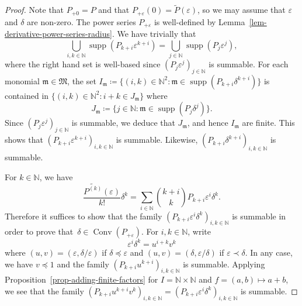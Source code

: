 \documentclass{article}
\newcommand{\assign}{\coloneqq}
\newcommand{\suchthat}{:}
\newcommand{\tmop}[1]{\ensuremath{\operatorname{#1}}}
\theoremstyle{remark}\newtheorem*{convention*}{Convention}
\begin{document}
\begin{proof}
  Note that $P_{+ 0} = P$ and that $P_{+ \varepsilon} (0) = \tilde{P}
  (\varepsilon)$, so we may assume that $\varepsilon$ and $\delta$ are
  non-zero. The power series $P_{+ \varepsilon}$ is well-defined by
  Lemma~\ref{lem-derivative-power-series-radius}. We have trivially that
  \[ \bigcup_{i, k \in \mathbb{N}} \tmop{supp} (P_{k + i} \varepsilon^{k + i})
     = \bigcup_{j \in \mathbb{N}} \tmop{supp} (P_j \varepsilon^j), \]
  where the right hand set is well-based since $(P_j \varepsilon^j)_{j \in
  \mathbb{N}}$ is summable. For each monomial $\mathfrak{m} \in \mathfrak{M}$,
  the set $I_{\mathfrak{m}} \assign \{ (i, k) \in \mathbb{N}^2 \suchthat
  \mathfrak{m} \in \tmop{supp} (P_{k + i} \delta^{k + i}) \}$ is contained in
  $\{ (i, k) \in \mathbb{N}^2 \suchthat i + k \in J_{\mathfrak{m}} \}$ where
  \[ J_{\mathfrak{m}} \assign \{ j \in \mathbb{N} \suchthat \mathfrak{m} \in
     \tmop{supp} (P_j \delta^j) \} . \]
  Since $(P_j \varepsilon^j)_{j \in \mathbb{N}}$ is summable, we deduce that
  $J_{\mathfrak{m}}$, and hence $I_{\mathfrak{m}}$ are finite. This shows that
  $(P_{k + i} \varepsilon^{k + i})_{i, k \in \mathbb{N}}$ is summable.
  Likewise, $(P_{k + i} \delta^{k + i})_{i, k \in \mathbb{N}}$ is summable.
  
  For $k \in \mathbb{N}$, we have
  \begin{equation}
    \frac{\widetilde{P^{(k)}} (\varepsilon)}{k!} \delta^k = \sum_{i \in
    \mathbb{N}} \binom{k + i}{k} P_{k + i} \varepsilon^i \delta^k .
    \label{eq-binom}
  \end{equation}
  Therefore it suffices to show that the family $(P_{k + i} \varepsilon^i
  \delta^k)_{i, k \in \mathbb{N}}$ is summable in order to prove that~$\delta
  \in \tmop{Conv} (P_{+ \varepsilon})$. For $i, k \in \mathbb{N}$, write
  \[ \varepsilon^i \delta^k = u^{i + k} v^k \]
  where $(u, v) = \left( \varepsilon, \delta / \varepsilon \right)$ if $\delta
  \preccurlyeq \varepsilon$ and $(u, v) = \left( \delta, \varepsilon / \delta
  \right)$ if $\varepsilon \prec \delta$. In any case, we have $v \preccurlyeq
  1$ and the family $(P_{k + i} u^{k + i})_{i, k \in \mathbb{N}}$ is summable.
  Applying Proposition~\ref{prop-adding-finite-factors} for $I =\mathbb{N}
  \times \mathbb{N}$ and $f = (a, b) \mapsto a + b$, we see that the family
  $(P_{k + i} u^{k + i} v^k)_{i, k \in \mathbb{N}} = (P_{k + i} \varepsilon^i
  \delta^k)_{i, k \in \mathbb{N}}$ is summable.
  

\end{proof}
\end{document}
